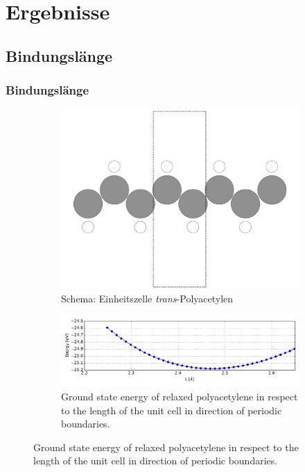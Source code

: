 \section{Ergebnisse}

\subsection{Bindungslänge}
\begin{frame}
\frametitle{Bindungslänge}
\begin{figure}[]
	\centering
	\begin{subfigure}{0.35\textwidth}
	\includegraphics[width = \textwidth]{Images/polyacetylene/convergence/polyacetylene_nice_unit_cell}
	\caption{Schema: Einheitszelle \emph{trans}-Polyacetylen}
	\end{subfigure}
	\begin{subfigure}{0.64\textwidth}
		\centering
		\includegraphics[width = \textwidth]{Images/polyacetylene/convergence/unit_cell_length}
		\caption{Ground state energy of relaxed polyacetylene in respect to the length of the unit cell in direction of periodic boundaries.}
		\label{image_poly_cell_len}
	\end{subfigure}
\end{figure}
\end{frame}